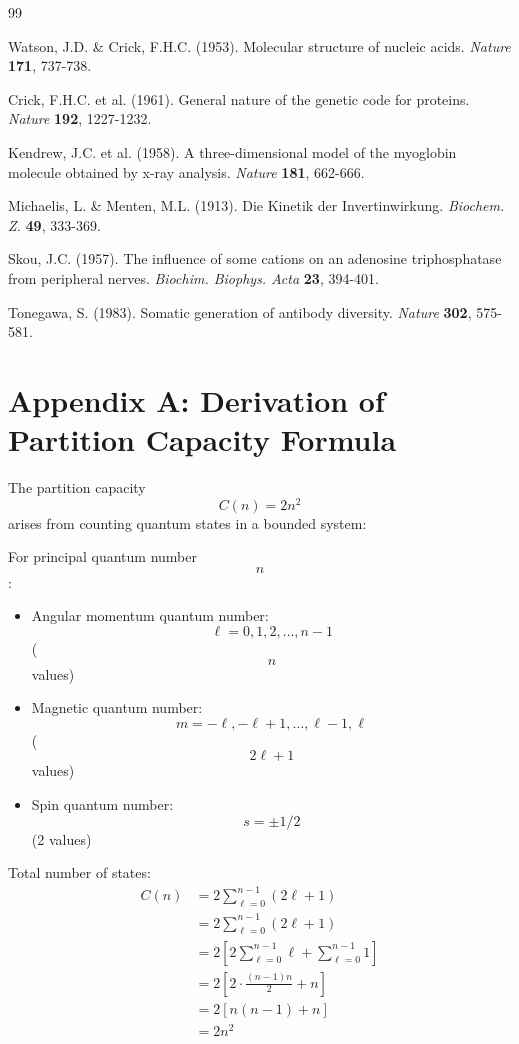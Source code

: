 \documentclass[12pt,a4paper]{article}
\begin{document}
\begin{thebibliography}{99}

 Watson, J.D. \& Crick, F.H.C. (1953). Molecular structure of nucleic acids. \textit{Nature} \textbf{171}, 737-738.

 Crick, F.H.C. et al. (1961). General nature of the genetic code for proteins. \textit{Nature} \textbf{192}, 1227-1232.

 Kendrew, J.C. et al. (1958). A three-dimensional model of the myoglobin molecule obtained by x-ray analysis. \textit{Nature} \textbf{181}, 662-666.

 Michaelis, L. \& Menten, M.L. (1913). Die Kinetik der Invertinwirkung. \textit{Biochem. Z.} \textbf{49}, 333-369.

 Skou, J.C. (1957). The influence of some cations on an adenosine triphosphatase from peripheral nerves. \textit{Biochim. Biophys. Acta} \textbf{23}, 394-401.

 Tonegawa, S. (1983). Somatic generation of antibody diversity. \textit{Nature} \textbf{302}, 575-581.

\end{thebibliography}

\appendix

\section{Appendix A: Derivation of Partition Capacity Formula}

The partition capacity $$C(n) = 2n^2$$ arises from counting quantum states in a bounded system:

For principal quantum number $$n$$:
\begin{itemize}
\item Angular momentum quantum number: $$\ell = 0, 1, 2, \ldots, n-1$$ ($$n$$ values)
\item Magnetic quantum number: $$m = -\ell, -\ell+1, \ldots, \ell-1, \ell$$ ($$2\ell+1$$ values)
\item Spin quantum number: $$s = \pm 1/2$$ (2 values)
\end{itemize}

Total number of states:
\begin{align}
C(n) &= 2 \sum_{\ell=0}^{n-1} (2\ell + 1) \\
&= 2 \sum_{\ell=0}^{n-1} (2\ell + 1) \\
&= 2 \left[ 2 \sum_{\ell=0}^{n-1} \ell + \sum_{\ell=0}^{n-1} 1 \right] \\
&= 2 \left[ 2 \cdot \frac{(n-1)n}{2} + n \right] \\
&= 2 [n(n-1) + n] \\
&= 2n^2
\end{align}
\end{document}
